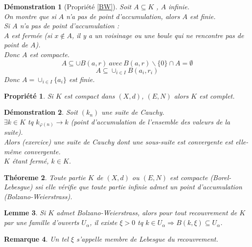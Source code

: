 \documentclass[a4paper, oneside]{report}
\theoremstyle{break}
\newtheorem{thm}{Théoreme}[section] %
\newtheorem{propr}[thm]{Propriété}
\newtheorem{lemme}[thm]{Lemme}
\newtheorem*{demo}{Démonstration}
\newtheorem{remar}[thm]{Remarque}
\begin{document}
\begin{demo}[Propriété \ref{BW}]
Soit $A\subseteq K$ , $A$ infinie.\\
On montre que si $A$ n'a pas de point d'accumulation, alors $A$ est finie.\\
Si $A$ n'a pas de point d'accumulation :\\
$A$ est fermée (si $x\notin A$, il y a un voisinage ou une boule qui ne rencontre pas de point de $A$).\\
Donc $A$ est compacte.
$$A\subseteq \cup B(a,r)~avec~B(a,r)\backslash \{0\} \cap A = \emptyset$$
$$A\subseteq \cup_{i\in I} B(a_i,r_i)$$
Donc $A=\cup_{i\in I}\{a_i\}$ est finie.
\end{demo}


\begin{propr}

Si $K$ est compact dans $(X,d)$, $(E,N)$ alors $K$ est complet.
\end{propr}

\begin{demo}
Soit $(k_n)$ une suite de Cauchy.\\
$\exists k\in K$ tq $k_{\varphi(n)} \rightarrow k$ (point d'accumulation de l'ensemble des valeurs de la suite).\\
Alors (exercice) une suite de Cauchy dont une sous-suite est convergente est elle-même convergente.\\
$K$ étant fermé, $k\in K$.
\end{demo}


\begin{thm}
\label{thm_1}
Toute partie $K$ de $(X,d)$ ou $(E,N)$ est compacte (Borel-Lebesgue) ssi elle vérifie que toute partie infinie admet un point d'accumulation (Bolzano-Weierstrass).
\end{thm}

\begin{lemme}
\label{lemme_1}
Si $K$ admet Bolzano-Weierstrass, alors pour tout recouvrement de $K$ par une famille d'ouverts $U_\alpha$, il existe $\xi > 0$ tq $k\in U_\alpha \Rightarrow B(k,\xi) \subseteq U_\alpha$.
\end{lemme}


\begin{remar}
Un tel $\xi$ s'appelle membre de Lebesgue du recouvrement.
\end{remar}
\end{document}
